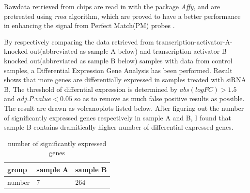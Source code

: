 \documentclass[fleqn,10pt]{wlscirep}
\begin{document}
Rawdata retrieved from chips are read in with the package \textit{Affy}, and are pretreated using \textit{rma} algorithm, which are proved to have a better performance in enhancing the signal from Perfect Match(PM) probes \cite{jianshu.com}. 

By respectively comparing the data retrieved from transcription-activator-A-knocked out(abbreviated as sample A below) and transcription-activator-B-knocked out(abbreviated as sample B below) samples with data from control samples, a Differential Expression Gene Analysis has been performed. Result shows that more genes are differentially expressed in samples treated with siRNA B, The threshold of differntial expression is determined by $abs(logFC) > 1.5$ and $adj.P.value < 0.05$ so as to remove as much false positive results as possible.  The result are drawn as volcanoplots listed below.
After figuring out the number of significantly expressed genes respectively in sample A and B, I found that sample B contains dramitically higher number of differential expressed genes.

\begin{table}[ht]
    \centering
    \begin{tabular}{|l|l|l|}
    \hline
    group & sample A & sample B \\
    \hline
    number & 7 & 264 \\
    \hline
    \end{tabular}
    \caption{\label{tab:example}number of significantly expressed genes }
    \end{table}
\end{document}
